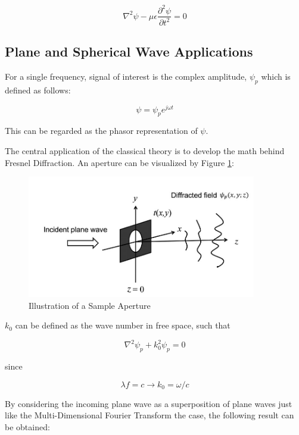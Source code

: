 \documentclass[12pt]{article}
\begin{document}
\begin{equation}
	\nabla^2\psi - \mu\epsilon\frac{\partial^2\psi}{\partial t^2} = 0
\end{equation}

\subsection{Plane and Spherical Wave Applications}

For a single frequency, signal of interest is the complex amplitude, \(\psi_{p}\) which is defined as follows:

\begin{equation}
	\psi = \psi_{p}e^{j \omega t}
\end{equation}

This can be regarded as the phasor representation of \(\psi\).

The central application of the classical theory is to develop the math behind Fresnel Diffraction. An aperture can be visualized by Figure \ref{fig:aperture}:

\begin{figure}
    \centering
    \includegraphics[width=100mm]{tupac5.png}
    \caption{Illustration of a Sample Aperture}
    \label{fig:aperture}
\end{figure}

\(k_{0}\) can be defined as the wave number in free space, such that

\begin{equation}
	\nabla^2\psi_{p} + k_{0}^2\psi_{p} = 0
\end{equation}

since

\begin{equation}
	\lambda f = c \rightarrow k_{0} = \omega/c
\end{equation}

By considering the incoming plane wave as a superposition of plane waves just like the Multi-Dimensional Fourier Transform the case, the following result can be obtained:
\end{document}
